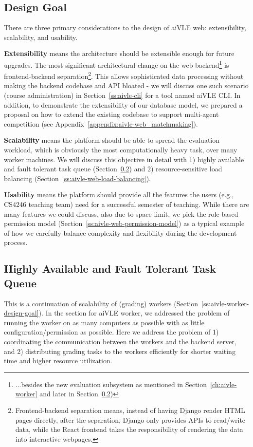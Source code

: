 \subsection{Design Goal}
There are three primary considerations to the design of aiVLE web: extensibility, scalability, and usability. 

\textbf{Extensibility} means the architecture should be extensible enough for future upgrades. The most significant architectural change on the web backend\footnote{...besides the new evaluation subsystem as mentioned in Section~\ref{ch:aivle-worker} and later in Section~\ref{ch:aivle-web_highly-available-task-queue})} is frontend-backend separation\footnote{Frontend-backend separation means, instead of having Django render HTML pages directly, after the separation, Django only provides APIs to read/write data, while the React frontend takes the responsibility of rendering the data into interactive webpages.}. This allows sophisticated data processing without making the backend codebase and API bloated - we will discuss one such scenario (course administration) in Section~\ref{ss:aivle-cli} for a tool named aiVLE CLI. In addition, to demonstrate the extensibility of our database model, we prepared a proposal on how to extend the existing codebase to support multi-agent competition (see Appendix~\ref{appendix:aivle-web_matchmaking}).

\textbf{Scalability} means the platform should be able to spread the evaluation workload, which is obviously the most computationally heavy task, over many worker machines. We will discuss this objective in detail with 1) highly available and fault tolerant task queue (Section~\ref{ch:aivle-web_highly-available-task-queue}) and 2) resource-sensitive load balancing (Section~\ref{ss:aivle-web-load-balancing}).

\textbf{Usability} means the platform should provide all the features the users (e.g., CS4246 teaching team) need for a successful semester of teaching. While there are many features we could discuss, also due to space limit, we pick the role-based permission model (Section~\ref{ss:aivle-web-permission-model}) as a typical example of how we carefully balance complexity and flexibility during the development process.

\subsection{Highly Available and Fault Tolerant Task Queue}
\label{ch:aivle-web_highly-available-task-queue}
This is a continuation of \hyperref[ss:aivle-worker-design-goal]{scalability of (grading) workers} (Section~\ref{ss:aivle-worker-design-goal}). In the section for aiVLE worker, we addressed the problem of running the worker on as many computers as possible with as little configuration/permission as possible. Here we address the problem of 1) coordinating the communication between the workers and the backend server, and 2) distributing grading tasks to the workers efficiently for shorter waiting time and higher resource utilization.
